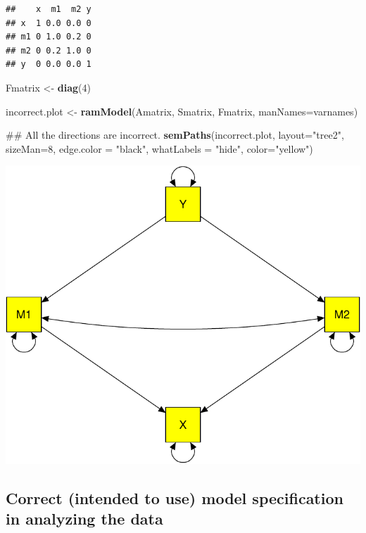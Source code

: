\documentclass[]{article}
\newenvironment{Shaded}{\begin{snugshade}}{\end{snugshade}}
\newcommand{\KeywordTok}[1]{\textcolor[rgb]{0.13,0.29,0.53}{\textbf{#1}}}
\newcommand{\DataTypeTok}[1]{\textcolor[rgb]{0.13,0.29,0.53}{#1}}
\newcommand{\DecValTok}[1]{\textcolor[rgb]{0.00,0.00,0.81}{#1}}
\newcommand{\StringTok}[1]{\textcolor[rgb]{0.31,0.60,0.02}{#1}}
\newcommand{\NormalTok}[1]{#1}
\begin{document}
\begin{verbatim}
##    x  m1  m2 y
## x  1 0.0 0.0 0
## m1 0 1.0 0.2 0
## m2 0 0.2 1.0 0
## y  0 0.0 0.0 1
\end{verbatim}

\begin{Shaded}
\begin{Highlighting}[]
\NormalTok{Fmatrix <-}\StringTok{ }\KeywordTok{diag}\NormalTok{(}\DecValTok{4}\NormalTok{)}

\NormalTok{incorrect.plot <-}\StringTok{ }\KeywordTok{ramModel}\NormalTok{(Amatrix, Smatrix, Fmatrix, }\DataTypeTok{manNames=}\NormalTok{varnames)}

\NormalTok{## All the directions are incorrect.}
\KeywordTok{semPaths}\NormalTok{(incorrect.plot, }\DataTypeTok{layout=}\StringTok{"tree2"}\NormalTok{, }\DataTypeTok{sizeMan=}\DecValTok{8}\NormalTok{, }\DataTypeTok{edge.color =} \StringTok{"black"}\NormalTok{, }
         \DataTypeTok{whatLabels =} \StringTok{"hide"}\NormalTok{, }\DataTypeTok{color=}\StringTok{"yellow"}\NormalTok{)}
\end{Highlighting}
\end{Shaded}

\includegraphics{Supplemental_materials_3_files/figure-latex/unnamed-chunk-6-1.pdf}

\subsection{Correct (intended to use) model specification in analyzing
the
data}\label{correct-intended-to-use-model-specification-in-analyzing-the-data}
\end{document}
